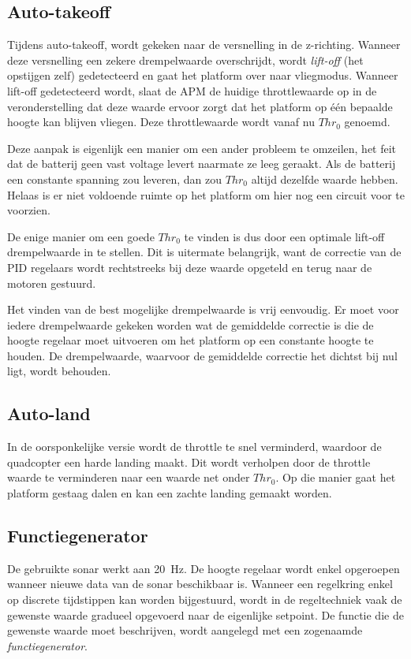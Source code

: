 \subsection{Auto-takeoff} \label{sec:autotakeoff}
Tijdens auto-takeoff, wordt gekeken naar de versnelling in de z-richting. Wanneer deze versnelling een zekere drempelwaarde overschrijdt, wordt \textit{lift-off} (het opstijgen zelf) gedetecteerd en gaat het platform over naar vliegmodus. Wanneer lift-off gedetecteerd wordt, slaat de APM de huidige throttlewaarde op  in de veronderstelling dat deze waarde ervoor zorgt dat het platform op \'e\'en bepaalde hoogte kan blijven vliegen. Deze throttlewaarde wordt vanaf nu ${Thr}_0$ genoemd.

\npar Deze aanpak is eigenlijk een manier om een ander probleem te omzeilen, het feit dat de batterij geen vast voltage levert naarmate ze leeg geraakt. Als de batterij een constante spanning zou leveren, dan zou ${Thr}_0$ altijd dezelfde waarde hebben. Helaas is er niet voldoende ruimte op het platform om hier nog een circuit voor te voorzien.

\npar De enige manier om een goede ${Thr}_0$ te vinden is dus door een optimale lift-off drempelwaarde in te stellen. Dit is uitermate belangrijk, want de correctie van de PID regelaars wordt rechtstreeks bij deze waarde opgeteld en terug naar de motoren gestuurd.

\npar Het vinden van de best mogelijke drempelwaarde is vrij eenvoudig. Er moet voor iedere drempelwaarde gekeken worden wat de gemiddelde correctie is die de hoogte regelaar moet uitvoeren om het platform op een constante hoogte te houden. De drempelwaarde, waarvoor de gemiddelde correctie het dichtst bij nul ligt, wordt behouden.

\subsection{Auto-land}
In de oorsponkelijke versie wordt de throttle te snel verminderd, waardoor de quadcopter een harde landing maakt. Dit wordt verholpen door de throttle waarde te verminderen naar een waarde net onder $Thr_0$. Op die manier gaat het platform gestaag dalen en kan een zachte landing gemaakt worden.

\subsection{Functiegenerator} \label{sec:functiegen}
De gebruikte sonar werkt aan \SI{20}{\Hz}. De hoogte regelaar wordt enkel opgeroepen wanneer nieuwe data van de sonar beschikbaar is. Wanneer een regelkring enkel op discrete tijdstippen kan worden bijgestuurd, wordt in de regeltechniek vaak de gewenste waarde gradueel opgevoerd naar de eigenlijke setpoint. De functie die de gewenste waarde moet beschrijven, wordt aangelegd met een zogenaamde \textit{functiegenerator}.

